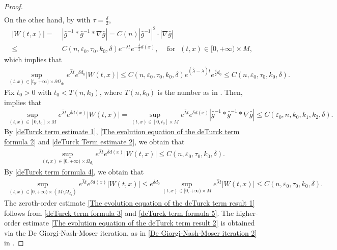 \documentclass[12pt]{amsart}
\begin{document}
\begin{proof}
\begin{equation}
\begin{split}
    \end{split}
\end{equation}
On the other hand, by  with $\tau = \frac{\delta}{2}$, 
\begin{equation}\label{deTurck term formula 4}
    \begin{split}
         |W(t, x)| =&\; |\hat{g}^{-1} * \hat{g}^{-1} * \nabla\hat{g}| = C(n) |\hat{g}^{-1}|^2\cdot |\nabla \hat{g}|\\
        \leq&\; C(n,\varepsilon_0,\tau_0, k_0, \delta) e^{-\lambda t} e^{-\frac{\delta}{2}d(x)}, \;\;\; \text{ for }\; (t, x)\in  [0, +\infty)\times  M,
    \end{split}
\end{equation}
which implies that 
\begin{align}\label{The evolution equation of the deTurck term formula 2}
    \sup_{(t, x)\in [t_0, +\infty) \times \partial \Omega_{d_0}} e^{\hat{\lambda}t}e^{\delta d_0}|W(t, x)| \leq C(n,\varepsilon_0,\tau_0, k_0, \delta)e^{(\hat{\lambda} - \lambda)t} e^{\frac{\delta}{2}d_0}\leq C(n,\varepsilon_0,\tau_0, k_0, \delta). 
\end{align}
Fix $t_0 > 0$ with $t_0 < T(n, k_0)$, where $T(n, k_0)$ is the number as in . Then,  implies that  
\begin{align}\label{deTurck Term estimate 2}
    \sup_{(t, x)\in [0, t_0]\times M} e^{\hat{\lambda} t} e^{\delta d(x)}|W(t, x)| = \sup_{(t, x)\in [0, t_0]\times M} e^{\hat{\lambda} t } e^{\delta d(x)} |\hat{g}^{-1} * \hat{g}^{-1} * \nabla\hat{g}|\leq C(\varepsilon_0, n, k_0, k_1, k_2, \delta).
\end{align}
By \eqref{deTurck term estimate 1}, \eqref{The evolution equation of the deTurck term formula 2} and \eqref{deTurck Term estimate 2}, we obtain that
\begin{align}\label{deTurck term formula 3}
    \sup_{(t, x)\in [0, +\infty)\times \Omega_{d_0}} e^{\hat{\lambda} t} e^{\delta d(x)} |W(t, x)| \leq C(n,\varepsilon_0,\tau_0, k_0, \delta). 
\end{align}
By \eqref{deTurck term formula 4}, we obtain that 
\begin{align}\label{deTurck term formula 5}
    \sup_{(t, x)\in [0, +\infty)\times (M\setminus\Omega_{d_0})} e^{\hat{\lambda}t}e^{\delta d(x)}|W(t, x)| \leq e^{\delta d_0} \sup_{(t, x)\in [0, +\infty) \times M} e^{\hat{\lambda}t}|W(t, x)|\leq C(n,\varepsilon_0,\tau_0, k_0, \delta).
\end{align}
The zeroth-order estimate \eqref{The evolution equation of the deTurck term result 1} follows from \eqref{deTurck term formula 3} and \eqref{deTurck term formula 5}. The higher-order estimate \eqref{The evolution equation of the deTurck term result 2} is obtained via the De Giorgi-Nash-Moser iteration, as in \eqref{De Giorgi-Nash-Moser iteration 2} in .
\end{proof}
\end{document}
